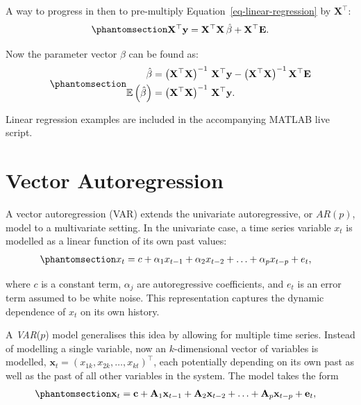 \documentclass[
  letterpaper,
  DIV=11,
  numbers=noendperiod]{scrreprt}
\begin{document}
A way to progress in then to pre-multiply
Equation~\ref{eq-linear-regression} by \(\mathbf{X}^{\top}\):
\begin{equation}\protect\phantomsection\label{eq-gen-0087}{  
\begin{align}
    \mathbf{X}^{\top}\mathbf{y} = \mathbf{X}^{\top}\mathbf{X}\, \hat{\beta} + \mathbf{X}^{\top} \mathbf{E}.
\end{align}
}\end{equation}

Now the parameter vector \(\beta\) can be found as:
\begin{equation}\protect\phantomsection\label{eq-gen-0088}{ 
\begin{align}
    \hat{\beta} &= \left(\mathbf{X}^{\top}\mathbf{X}\right)^{-1}\, \mathbf{X}^{\top}\mathbf{y}  - \left(\mathbf{X}^{\top}\mathbf{X}\right)^{-1}\mathbf{X}^{\top} \mathbf{E} \nonumber \\
    \mathbb{E}\left(\hat{\beta}\right) &= \left(\mathbf{X}^{\top}\mathbf{X}\right)^{-1}\, \mathbf{X}^{\top}\mathbf{y}.
\end{align}
}\end{equation}

Linear regression examples are included in the accompanying MATLAB live
script.

\section{Vector Autoregression}\label{vector-autoregression}

A vector autoregression (VAR) extends the univariate autoregressive, or
\(AR(p)\), model to a multivariate setting. In the univariate case, a
time series variable \(x_t\) is modelled as a linear function of its own
past values:
\begin{equation}\protect\phantomsection\label{eq-gen-0089}{ 
\begin{align}
    x_t &= c + \alpha_1 x_{t-1} + \alpha_2 x_{t-2} + \ldots + \alpha_p x_{t-p} + e_t,
\end{align}
}\end{equation}

where \(c\) is a constant term, \(\alpha_j\) are autoregressive
coefficients, and \(e_t\) is an error term assumed to be white noise.
This representation captures the dynamic dependence of \(x_t\) on its
own history.

A \emph{VAR}(\(p\)) model generalises this idea by allowing for multiple
time series. Instead of modelling a single variable, now an
\(k\)-dimensional vector of variables is modelled,
\(\mathbf{x}_t = (x_{1k}, x_{2k}, \ldots, x_{kt})^{\top}\), each
potentially depending on its own past as well as the past of all other
variables in the system. The model takes the form
\begin{equation}\protect\phantomsection\label{eq-gen-0090}{  
\begin{align}
    \mathbf{x}_t &= \mathbf{c} + \mathbf{A}_1 \mathbf{x}_{t-1} + \mathbf{A}_2 \mathbf{x}_{t-2} + \ldots + \mathbf{A}_p \mathbf{x}_{t-p} + \mathbf{e}_t,
\end{align}
}\end{equation}
\end{document}
